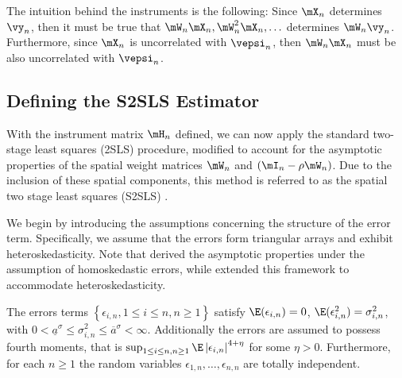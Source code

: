 \begin{remark}
The intuition behind the instruments is the following: Since $\mX_n$ determines $\vy_n$, then it must be true that $\mW_n\mX_n, \mW^2_n\mX_n, \ldots$ determines $\mW_n\vy_n$. Furthermore, since $\mX_n$ is uncorrelated with $\vepsi_n$, then $\mW_n\mX_n$ must be also uncorrelated with $\vepsi_n$.
\end{remark}

\subsection{Defining the S2SLS Estimator}

With the instrument matrix $\mH_n$ defined, we can now apply the standard two-stage least squares (2SLS) procedure, modified to account for the asymptotic properties of the spatial weight matrices $\mW_n$ and $(\mI_n - \rho\mW_n)$. Due to the inclusion of these spatial components, this method is referred to as the spatial two stage least squares (S2SLS) \citep{kelejian1998generalized}. 

We begin by introducing the assumptions concerning the structure of the error term. Specifically, we assume that the errors form triangular arrays and exhibit heteroskedasticity. Note that \cite{kelejian1998generalized} derived the asymptotic properties under the assumption of homoskedastic errors, while \cite{kelejian2010specification} extended this framework to accommodate heteroskedasticity. 



\begin{assumption}\label{assu:errors_triang}
The errors terms $\left\lbrace \epsilon_{i,n}, 1 \leq i \leq n, n\geq 1\right\rbrace$ satisfy $\E(\epsilon_{i,n})= 0$, $\E(\epsilon_{i,n}^2) = \sigma^2_{i,n}$, with $0 < \underline{a}^\sigma \leq \sigma^2_{i,n}\leq \overline{a}^\sigma<\infty$. Additionally the errors are assumed to possess fourth moments, that is $\sup_{1\leq i \leq n, n\geq 1}\E\left|\epsilon_{i, n}\right|^{4 + \eta}$ for some $\eta > 0$.  Furthermore, for each $n\geq 1$ the random variables $\epsilon_{1, n}, \ldots, \epsilon_{n, n}$ are totally independent. 
\end{assumption}

